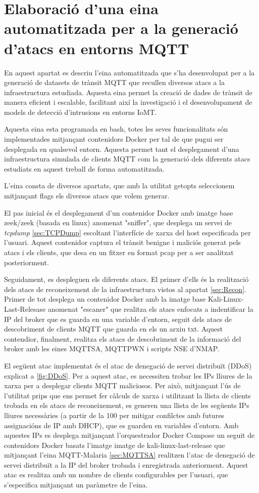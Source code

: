 \chapter{Elaboració d'una eina automatitzada per a la generació d'atacs en entorns MQTT}
\label{sec:tool}
En aquest apartat es descriu l'eina automatitzada que s'ha desenvolupat per a la generació de datasets de trànsit MQTT que recullen diversos atacs a la infraestructura estudiada. Aquesta eina permet la creació de dades de trànsit de manera eficient i escalable, facilitant així la investigació i el desenvolupament de models de detecció d'intrusions en entorns IoMT.

Aquesta eina esta programada en bash, totes les seves funcionalitats són implementades mitjançant contenidors Docker per tal de que pugui ser desplegada en qualsevol entorn. Aquesta permet tant el desplegament d'una infraestructura simulada de clients MQTT com la generació dels diferents atacs estudiats en aquest treball de forma automatitzada.

L'eina consta de diversos apartats, que amb la utilitat getopts seleccionem mitjançant flags els diversos atacs que volem generar.

El pas inicial és el desplegament d'un contenidor Docker amb imatge base zeek/zeek (basada en linux) anomenat "sniffer", que desplega un servei de \textit{tcpdump} \ref{sec:TCPDump} escoltant l'interfície de xarxa del host especificada per l'usuari. Aquest contenidor captura el trànsit benigne i maliciós generat pels atacs i els clients, que desa en un fitxer en format pcap per a ser analitzat posteriorment.

Seguidament, es despleguen els diferents atacs. El primer d'ells és la realització dels atacs de reconeixement de la infraestructura vistos al apartat \ref{sec:Recon}. Primer de tot desplega un contenidor Docker amb la imatge base Kali-Linux-Last-Relesase anomenat "escaner" que realitza els atacs enfocats a indentificar la IP del broker que es guarda en una variable d'entorn, seguit dels atacs de descobriment de clients MQTT que guarda en els un arxiu txt. Aquest contendior, finalment, realitza els atacs de descobriment de la informació del broker amb les eines MQTTSA, MQTTPWN i scripts NSE d'NMAP.

El següent atac implementat és el atac de denegació de servei distribuït (DDoS) explicat a \ref{fig:DDoS}. Per a aquest atac, es necessiten trobar les IPs lliures de la xarxa per a desplegar clients MQTT maliciosos. Per això, mitjançant l'ús de l'utilitat prips que ens permet fer càlculs de xarxa i utilitzant la llista de clients trobada en els atacs de reconeixement, es generen una llista de les següents IPs lliures necessàries (a partir de la 100 per mitigar confilctes amb futures assignacións de IP amb DHCP), que es guarden en variables d'entorn. Amb aquestes IPs es desplega mitjançant l'orquestrador Docker Compose un seguit de contenidors Docker basats l'imatge imatge de kali-linux-last-release que mitjançant l'eina MQTT-Malaria \ref{sec:MQTTSA} realitzen l'atac de denegació de servei distribuït a la IP del broker trobada i enregistrada anteriorment. Aquest atac es realitza amb un nombre de clients configurables per l'usuari, que s'especifica mitjançant un paràmetre de l'eina.

